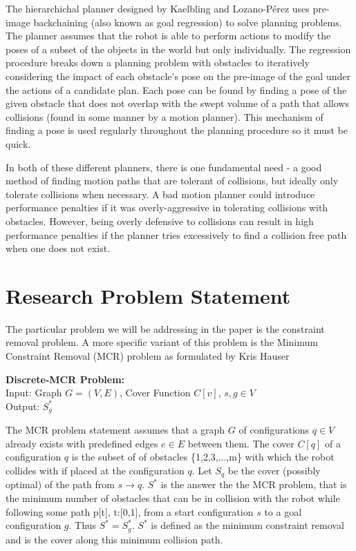 The hierarchichal planner designed by Kaelbling and Lozano-P\'{e}rez uses pre-image backchaining (also known as goal regression) to solve planning problems. The planner assumes that the robot is able to perform actions to modify the poses of a subset of the objects in the world but only individually. The regression procedure breaks down a planning problem with obstacles to iteratively considering the impact of each obstacle's pose on the pre-image of the goal under the actions of a candidate plan. Each pose can be found by finding a pose of the given obstacle that does not overlap with the swept volume of a path that allows collisions (found in some manner by a motion planner). This mechanism of finding a pose is used regularly throughout the planning procedure so it must be quick.

In both of these different planners, there is one fundamental need - a good method of finding motion paths that are tolerant of collisions, but ideally only tolerate collisions when necessary. A bad motion planner could introduce performance penalties if it was overly-aggressive in tolerating collisions with obstacles. However, being overly defensive to collisions can result in high performance penalties if the planner tries excessively to find a collision free path when one does not exist. 

\section{Research Problem Statement} \label{intro:statement}
The particular problem we will be addressing in the paper is the constraint removal problem. A more specific variant of this problem is the Minimum Constraint Removal (MCR) problem as formulated by Kris Hauser \cite{hauser:mcr}
\newline

\noindent
{\bf{Discrete-MCR Problem:}}\\
Input: Graph $G = (V,E)$, Cover Function $C[v]$, $s,g \in V$  \\
Output: $S^{*}_g$
\newline

The MCR problem statement assumes that a graph $G$ of configurations $q \in V$ already exists with predefined edges $e \in E$ between them. The cover $C[q]$ of a configuration $q$ is the subset of of obstacles \{1,2,3,...,m\} with which the robot collides with if placed at the configuration $q$. Let $S_q$ be the cover (possibly optimal) of the path from $s \rightarrow q$. $S^{*}$ is the answer the the MCR problem, that is the minimum number of obstacles that can be in collision with the robot while following some path p[t], t:[0,1], from a start configuration $s$ to a goal configuration $g$. Thus $S^{*} = S^{*}_g$. $S^{*}$ is defined as the minimum constraint removal and is the cover along this minimum collision path. 

